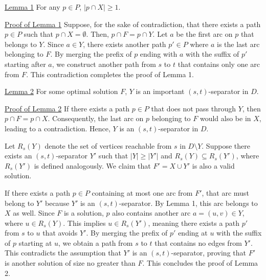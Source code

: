 \documentclass[12pt]{article}
\begin{document}
	\medskip
	
	\underline{Lemma 1} For any \(p \in P\), \(|p \cap X| \geqslant 1\).
	
	\medskip
	
	\underline{Proof of Lemma 1} Suppose, for the sake of contradiction, that
	there exists a path \(p \in P\) such that \(p \cap X = \emptyset\). Then,
	\(p \cap F = p \cap Y\). Let \(a\) be the first arc on \(p\) that belongs to
	\(Y\). Since \(a \in Y\), there exists another path \(p' \in P\) where \(a\)
	is the last arc belonging to \(F\). By merging the prefix of \(p\) ending
	with \(a\) with the suffix of \(p'\) starting after \(a\), we construct
	another path from \(s\) to \(t\) that contains only one arc from \(F\). This
	contradiction completes the proof of Lemma 1.
	
	\medskip
	
	\underline{Lemma 2} For some optimal solution \(F\), \(Y\) is an important
	\((s, t)\)-separator in \(D\).
	
	\medskip
	
	\underline{Proof of Lemma 2} If there exists a path \(p \in P\) that does
	not pass through \(Y\), then \(p \cap F = p \cap X\). Consequently, the last
	arc on \(p\) belonging to \(F\) would also be in \(X\), leading to a
	contradiction. Hence, \(Y\) is an \((s, t)\)-separator in \(D\).
	
	\smallskip
	
	Let \(R_{s}(Y)\) denote the set of vertices reachable from \(s\) in \(D
	\setminus Y\). Suppose there exists an \((s, t)\)-separator \(Y'\) such that
	\(|Y| \geqslant |Y'|\) and \(R_{s}(Y) \subseteq R_{s}(Y')\), where
	\(R_{s}(Y')\) is defined analogously. We claim that \(F' = X \cup Y'\) is
	also a valid solution.
	
	\smallskip
	
	If there exists a path \(p \in P\) containing at most one arc from \(F'\),
	that arc must belong to \(Y'\) because \(Y'\) is an \((s, t)\)-separator.
	By Lemma 1, this arc belongs to \(X\) as well. Since \(F\) is a solution,
	\(p\) also contains another arc \(a = (u, v) \in Y\), where \(u \in
	R_{s}(Y)\). This implies \(u \in R_{s}(Y')\), meaning there exists a path
	\(p'\) from \(s\) to \(u\) that avoids \(Y'\). By merging the prefix of
	\(p'\) ending at \(u\) with the suffix of \(p\) starting at \(u\), we obtain
	a path from \(s\) to \(t\) that contains no edges from \(Y'\). This
	contradicts the assumption that \(Y'\) is an \((s, t)\)-separator, proving
	that \(F'\) is another solution of size no greater than \(F\). This
	concludes the proof of Lemma 2.
	
\end{document}
